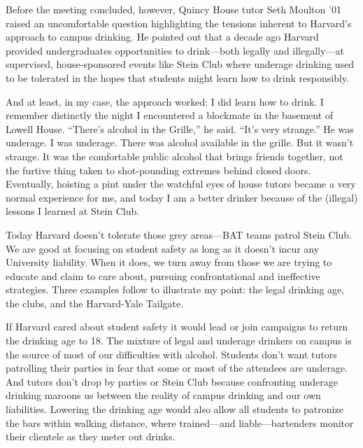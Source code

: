 Before the meeting concluded, however, Quincy House tutor Seth Moulton '01
raised an uncomfortable question highlighting the tensions inherent to
Harvard's approach to campus drinking. He pointed out that a decade ago
Harvard provided undergraduates opportunities to drink---both legally and
illegally---at supervised, house-sponsored events like Stein Club where
underage drinking used to be tolerated in the hopes that students might learn
how to drink responsibly.

And at least, in my case, the approach worked: I did learn how to drink. I
remember distinctly the night I encountered a blockmate in the basement of
Lowell House. ``There's alcohol in the Grille,'' he said. ``It's very
strange.'' He was underage. I was underage. There was alcohol available in
the grille. But it wasn't strange. It was the comfortable public alcohol that
brings friends together, not the furtive thing taken to shot-pounding
extremes behind closed doors. Eventually, hoisting a pint under the watchful
eyes of house tutors became a very normal experience for me, and today I am a
better drinker because of the (illegal) lessons I learned at Stein Club.

Today Harvard doesn't tolerate those grey areas---BAT teams patrol Stein
Club. We are good at focusing on student safety as long as it doesn't incur
any University liability. When it does, we turn away from those we are trying
to educate and claim to care about, pursuing confrontational and ineffective
strategies. Three examples follow to illustrate my point: the legal drinking
age, the clubs, and the Harvard-Yale Tailgate.

If Harvard cared about student safety it would lead or join campaigns to
return the drinking age to 18. The mixture of legal and underage drinkers on
campus is the source of most of our difficulties with alcohol. Students don't
want tutors patrolling their parties in fear that some or most of the
attendees are underage. And tutors don't drop by parties or Stein Club
because confronting underage drinking maroons us between the reality of
campus drinking and our own liabilities. Lowering the drinking age would also
allow all students to patronize the bars within walking distance, where
trained---and liable---bartenders monitor their clientele as they meter out
drinks.

